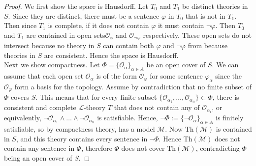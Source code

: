 \documentclass{article}
\begin{document}
\begin{enumerate}
    \begin{proof}
      We first show the space is Hausdorff. Let $T_0$ and $T_1$ be distinct
      theories in $S$. Since they are distinct, there must be a sentence
      $\varphi$ in $T_0$ that is not in $T_1$. Then since $T_1$ is
      complete, if it does not contain $\varphi$ it must contain
      $\neg\varphi$. Then $T_0$ and $T_1$ are contained in open
      sets$\mathcal{O}_\varphi$ and $\mathcal{O}_{\neg\varphi}$
      respectively. These open sets do not intersect because no theory in
      $S$ can contain both $\varphi$ and $\neg\varphi$ from because
      theories in $S$ are consistent. Hence the space is Hausdorff. \\

      Next we show compactness. Let $\Phi=\{\mathcal{O}_\alpha\}_{\alpha\in
      A}$ be an open cover of $S$. We can assume that each open set
      $\mathcal{O}_\alpha$ is of the form $\mathcal{O}_{\varphi}$ for some
      sentence $\varphi_\alpha$ since the $\mathcal{O}_\varphi$ form a
      basis for the topology. Assume by contradiction that no finite
      subset of $\Phi$ covers $S$. This means that for every finite
      subset
      $\{\mathcal{O}_{\alpha_1},\ldots,\mathcal{O}_{\alpha_n}\}\subset\Phi$,
      there is consistent and complete $\mathcal{L}$-theory $T$ that does
      not contain any of $\mathcal{O}_{\alpha_i}$, or equivalently,
      $\neg\mathcal{O}_{\alpha_1}\wedge\ldots\wedge\neg\mathcal{O}_{\alpha_n}$
      is satisfiable. Hence,
      $\neg\Phi:=\{\neg\mathcal{O}_\alpha\}_{\alpha\in A}$ is finitely
      satisfiable, so by compactness theory, has a model $\mathcal{M}$.
      Now $\text{Th}(\mathcal{M})$ is contained in $S$, and this theory
      contains every sentence in $\neg\Phi$. Hence $\text{Th}(\mathcal{M})$
      does not contain any sentence in $\Phi$, therefore $\Phi$
      does not cover $\text{Th}(\mathcal{M})$, contradicting $\Phi$ being
      an open cover of $S$.
    \end{proof}


\end{enumerate}
\end{document}
